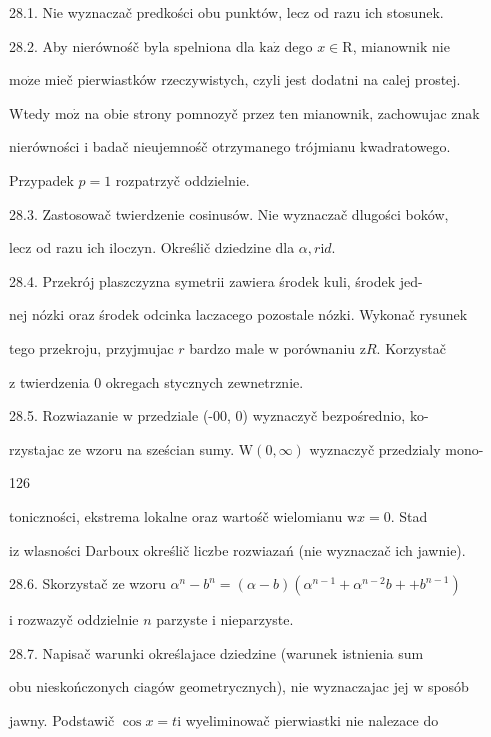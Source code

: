\documentclass[a4paper,12pt]{article}
\begin{document}
28.1. Nie wyznaczač predkości obu punktów, lecz od razu ich stosunek.

28.2. Aby nierównośč byla spelniona dla $\mathrm{k}\mathrm{a}\dot{\mathrm{z}}$ dego $x\in \mathrm{R}$, mianownik nie

$\mathrm{m}\mathrm{o}\dot{\mathrm{z}}\mathrm{e}$ mieč pierwiastków rzeczywistych, czyli jest dodatni na calej prostej.

Wtedy $\mathrm{m}\mathrm{o}\dot{\mathrm{z}}$ na obie strony pomnozyč przez ten mianownik, zachowujac znak

nierówności $\mathrm{i}$ badač nieujemnośč otrzymanego trójmianu kwadratowego.

Przypadek $p=1$ rozpatrzyč oddzielnie.

28.3. Zastosowač twierdzenie cosinusów. Nie wyznaczač dlugości boków,

lecz od razu ich iloczyn. Określič dziedzine dla $\alpha, r\mathrm{i}d.$

28.4. Przekrój plaszczyzna symetrii zawiera środek kuli, środek jed-

nej nózki oraz środek odcinka laczacego pozostale nózki. Wykonač rysunek

tego przekroju, przyjmujac $r$ bardzo male $\mathrm{w}$ porównaniu $\mathrm{z}R$. Korzystač

$\mathrm{z}$ twierdzenia $0$ okregach stycznych zewnetrznie.

28.5. Rozwiazanie $\mathrm{w}$ przedziale (-00, 0) wyznaczyč bezpośrednio, ko-

rzystajac ze wzoru na sześcian sumy. $\mathrm{W}(0,\infty)$ wyznaczyč przedzialy mono-





126

toniczności, ekstrema lokalne oraz wartośč wielomianu $\mathrm{w} x = 0$. Stad

$\mathrm{i}\mathrm{z}$ wlasności Darboux określič liczbe rozwiazań (nie wyznaczač ich jawnie).

28.6. Skorzystač ze wzoru $\alpha^{n}-b^{n}=(\alpha-b)(\alpha^{n-1}+\alpha^{n-2}b++b^{n-1})$

$\mathrm{i}$ rozwazyč oddzielnie $n$ parzyste $\mathrm{i}$ nieparzyste.

28.7. Napisač warunki określajace dziedzine (warunek istnienia sum

obu nieskończonych ciagów geometrycznych), nie wyznaczajac jej $\mathrm{w}$ sposób

jawny. Podstawič $\cos x = t \mathrm{i}$ wyeliminowač pierwiastki nie nalezace do
\end{document}
